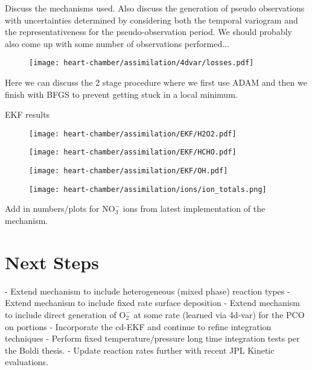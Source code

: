 Discuss the mechanisms used. Also discuss the generation of pseudo observations with uncertainties determined by considering both the temporal variogram and the representativeness for the pseudo-observation period. We should probably also come up with some number of observations performed...




\begin{figure}[h]
  \centering
  \texttt{[image: heart-chamber/assimilation/4dvar/losses.pdf]}
\end{figure}
Here we can discuss the 2 stage procedure where we first use ADAM and then we finish with BFGS to prevent getting stuck in a local minimum.



EKF results

\begin{figure}[h]
  \centering
  \texttt{[image: heart-chamber/assimilation/EKF/H2O2.pdf]}
\end{figure}

\begin{figure}[h]
  \centering
  \texttt{[image: heart-chamber/assimilation/EKF/HCHO.pdf]}
\end{figure}

\begin{figure}[h]
  \centering
  \texttt{[image: heart-chamber/assimilation/EKF/OH.pdf]}
\end{figure}


\begin{figure}[h]
  \centering
  \texttt{[image: heart-chamber/assimilation/ions/ion\_totals.png]}
\end{figure}


Add in numbers/plots for $\mathrm{NO_3^-}$ ions from latest implementation of the mechanism.


\section{Next Steps}


- Extend mechanism to include heterogeneous (mixed phase) reaction types
- Extend mechanism to include fixed rate surface deposition
- Extend mechanism to include direct generation of $\mathrm{O_2^-}$ at some rate (learned via 4d-var) for the PCO on portions
- Incorporate the cd-EKF and continue to refine integration techniques
- Perform fixed temperature/pressure long time integration tests per the Boldi thesis.
- Update reaction rates further with recent JPL Kinetic evaluations.

